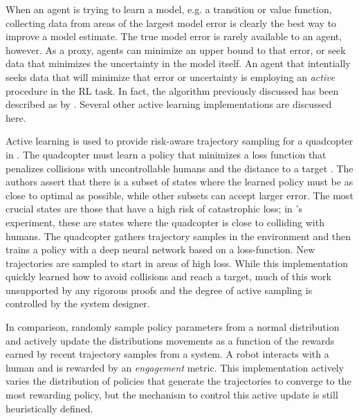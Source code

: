     When an agent is trying to learn a model, e.g. a transition or value function, collecting data from areas of the
    largest model error is clearly the best way to improve a model estimate. The true model error is rarely available to
    an agent, however. As a proxy, agents can minimize an upper bound to that error, or seek data that minimizes the
    uncertainty in the model itself. An agent that intentially seeks data that will minimize that error or uncertainty
    is employing an \emph{active} procedure in the \ac{RL} task. In fact, the \DAGGER algorithm \cite{ross2011reduction}
    previously discussed has been described as  by
    \cite{andersson2017deep}. Several other active learning implementations are discussed here.

    Active learning is used to provide risk-aware trajectory sampling for a quadcopter in \cite{andersson2017deep}. The
    quadcopter must learn a policy that minimizes a loss function that penalizes collisions with uncontrollable humans
    and the distance to a target \cite{andersson2017deep}. The authors assert that there is a subset of states where the
    learned policy must be as close to optimal as possible, while other subsets can accept larger error. The most
    crucial states are those that have a high risk of catastrophic loss; in \cite{andersson2017deep}'s experiment, these
    are states where the quadcopter is close to colliding with humans. The quadcopter gathers trajectory samples in the
    environment and then trains a policy with a deep neural network based on a loss-function. New trajectories are
    sampled to start in areas of high loss. While this implementation quickly learned how to avoid collisions and reach
    a target, much of this work unsupported by any rigorous proofs and the degree of active sampling is controlled by
    the system designer.

    In comparison, \cite{khamassi2017active} randomly sample policy parameters from a normal distribution and actively
    update the distributions movements as a function of the rewards earned by recent trajectory samples from a system. A
    robot interacts with a human and is rewarded by an \emph{engagement} metric. This implementation actively varies the
    distribution of policies that generate the trajectories to converge to the most rewarding policy, but the mechanism
    to control this active update is still heuristically defined.


